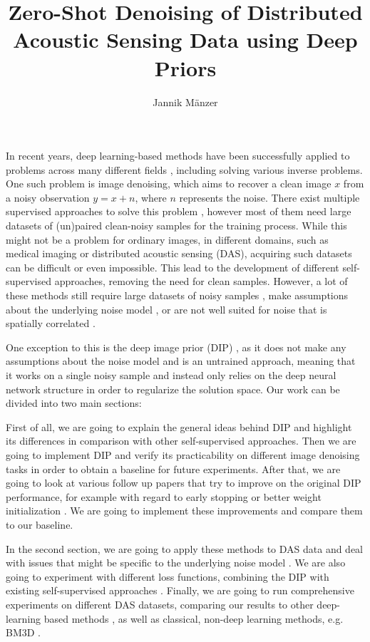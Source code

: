 \documentclass[a4paper, 12pt]{article}
\title{\textbf{Zero-Shot Denoising of Distributed Acoustic Sensing Data using Deep Priors}}
\author{Jannik Mänzer}
\date{}
\begin{document}
\maketitle

In recent years, deep learning-based methods have been successfully applied to problems across many different fields
\cite{ImageNet, GAN, GPT3}, including solving various inverse problems. One such problem is image denoising, which aims
to recover a clean image $x$ from a noisy observation $y = x + n$, where $n$ represents the noise. There exist multiple
supervised approaches to solve this problem \cite{DnCNN, GCBD}, however most of them need large datasets of (un)paired
clean-noisy samples for the training process. While this might not be a problem for ordinary images, in different
domains, such as medical imaging or distributed acoustic sensing (DAS), acquiring such datasets can be difficult or even
impossible. This lead to the development of different self-supervised approaches, removing the need for clean samples.
However, a lot of these methods still require large datasets of noisy samples \cite{Noise2Noise}, make assumptions about
the underlying noise model \cite{Noisier2Noise}, or are not well suited for noise that is spatially correlated
\cite{Noise2Self}.

One exception to this is the deep image prior (DIP) \cite{DIP}, as it does not make any assumptions about the noise
model and is an untrained approach, meaning that it works on a single noisy sample and instead only relies on the deep
neural network structure in order to regularize the solution space. Our work can be divided into two main sections:

First of all, we are going to explain the general ideas behind DIP and highlight its differences in comparison with
other self-supervised approaches. Then we are going to implement DIP and verify its practicability on different image
denoising tasks in order to obtain a baseline for future experiments. After that, we are going to look at various follow
up papers that try to improve on the original DIP performance, for example with regard to early stopping
\cite{EarlyStopping, RethinkingDIP} or better weight initialization \cite{MetaDIP, EDIP}. We are going to implement
these improvements and compare them to our baseline.

In the second section, we are going to apply these methods to DAS data and deal with issues that might be specific to
the underlying noise model \cite{SelfMixed}. We are also going to experiment with different loss functions, combining
the DIP with existing self-supervised approaches \cite{DDIP, Noise2Self, Noise2Same}. Finally, we are going to run
comprehensive experiments on different DAS datasets, comparing our results to other deep-learning based methods
\cite{DAS-N2N, DAS-J-invariant, SelfMixed}, as well as classical, non-deep learning methods, e.g. BM3D \cite{BM3D}.

\printbibliography
\end{document}
